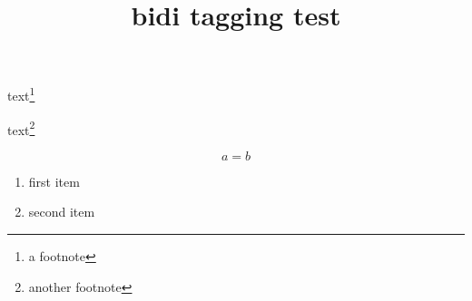 \documentclass{article}
\title{bidi tagging test}
\begin{document}
text\footnote{a footnote}

text\footnote{another footnote}

\begin{equation}
a=b
\end{equation}

\begin{enumerate} %
\item first item
\item second item
\end{enumerate}
\end{document}
